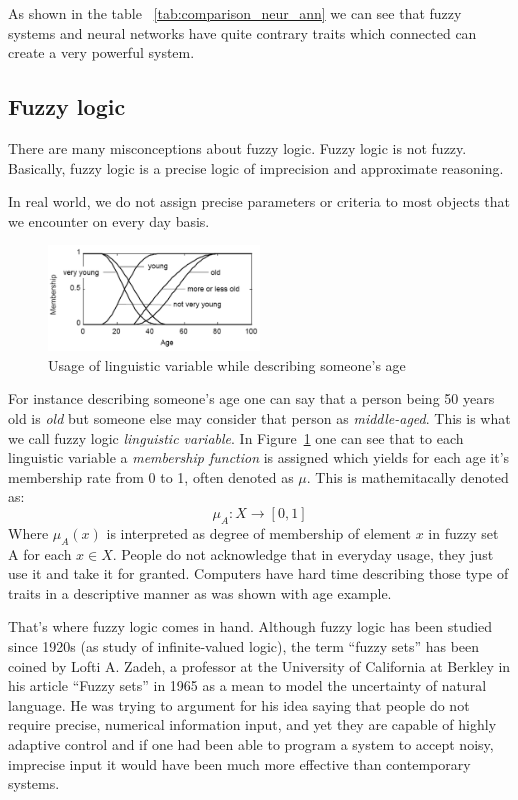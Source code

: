 As shown in the table ~\ref{tab:comparison_neur_ann} we can see that fuzzy systems and neural networks have quite contrary traits which connected can create a very powerful system.

\subsection{Fuzzy logic}
There are many misconceptions about fuzzy logic.
Fuzzy logic is not fuzzy.
Basically, fuzzy logic is a precise logic of imprecision and approximate reasoning.

In real world, we do not assign precise parameters or criteria to most objects that we encounter on every day basis.

\begin{figure}
	\captionsetup{width=18pc}
	\vspace*{-2em}
	\hspace*{1.5em}
	\includegraphics[width=0.5\textwidth]{images/old_graph.png}
	\caption{Usage of linguistic variable while describing someone's age~\cite{lecture_rome_university}}
	\label{fig:old_graph}
	\vspace*{-2em}
\end{figure}

For instance describing someone's age one can say that a person being 50 years old is \emph{old} but someone else may consider that person as \emph{middle-aged}.
This is what we call fuzzy logic \emph{linguistic variable}.
In Figure~\ref{fig:old_graph} one can see that to each linguistic variable a \emph{membership function} is assigned which yields for each age it's membership rate from 0 to 1, often denoted as $\mu$.
This is mathemitacally denoted as: $$ \mu_A : X \rightarrow [0,1] $$
Where $\mu_A(x)$ is interpreted as degree of membership of element $x$ in fuzzy set A for each $x \in X$.
People do not acknowledge that in everyday usage, they just use it and take it for granted.
Computers have hard time describing those type of traits in a descriptive manner as was shown with age example.

That's where fuzzy logic comes in hand.
Although fuzzy logic has been studied since 1920s (as study of infinite-valued logic), the term ``fuzzy sets'' has been coined by Lofti A. Zadeh, a professor at the University of California at Berkley in his article ``Fuzzy sets'' in 1965 \cite{fuzzy_sets_zadeh} as a mean to model the uncertainty
of natural language.
He was trying to argument for his idea saying that people do not require precise, numerical information input, and yet they are capable of highly adaptive control and if one had been able to program a system to accept noisy, imprecise input it would have been much more effective than contemporary systems.

